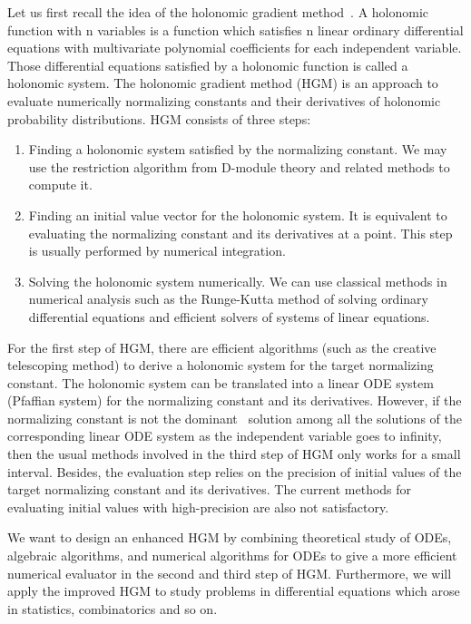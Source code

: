 \documentclass[10pt,a4paper]{article}
\begin{document}
  Let us first recall the idea of the holonomic gradient method~\cite{Nakayama2011}. A holonomic function with n variables is a function which satisfies n linear ordinary differential equations with multivariate polynomial coefficients for each independent variable. Those differential equations satisfied by a holonomic function is called a holonomic system. The holonomic gradient method (HGM) is an approach to evaluate numerically normalizing constants and their derivatives of holonomic probability distributions. HGM consists of three steps: 
\begin{enumerate}
  \item Finding a holonomic system satisfied by the normalizing constant. We may use the restriction algorithm from D-module theory and related methods to compute it. 
  \item Finding an initial value vector for the holonomic system. It is equivalent to evaluating the normalizing constant and its derivatives at a point. This step is usually performed by numerical integration.
  \item Solving the holonomic system numerically. We can use classical methods in numerical analysis such as the Runge-Kutta method of solving ordinary differential equations and efficient solvers of systems of linear equations.
  \end{enumerate}

For the first step of HGM, there are efficient algorithms (such as the creative telescoping method) to derive a holonomic system for the target normalizing constant. The holonomic system can be translated into a linear ODE system (Pfaffian system) for the normalizing constant and its derivatives. However, if the normalizing constant is not the dominant~\cite{Danufane2018} solution among all the solutions of the corresponding linear ODE system as the independent variable goes to infinity, then the usual methods involved in the third step of HGM only works for a small interval. Besides, the evaluation step relies on the precision of initial values of the target normalizing constant and its derivatives. The current methods for evaluating initial values with high-precision are also not satisfactory.
  
  We want to design an enhanced HGM by combining theoretical study of ODEs, algebraic algorithms, and numerical algorithms for ODEs to give a more efficient numerical evaluator in the second and third step of HGM. Furthermore, we will apply the improved HGM to study problems in differential equations which arose in statistics, combinatorics and so on.  
\end{document}
